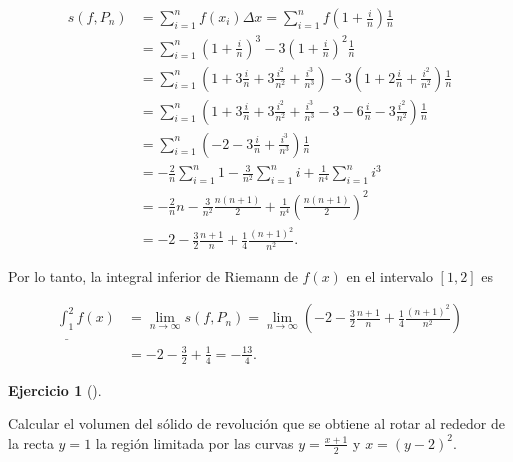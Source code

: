 \documentclass[
  spanish,
  a4paper,
]{scrreport}
\theoremstyle{definition}
\newtheorem{exercise}{Ejercicio}[chapter]
\theoremstyle{remark}
\begin{document}
\begin{tcolorbox}
\begin{align*}
s(f,P_n) 
&= \sum_{i=1}^{n} f(x_i) \Delta x = \sum_{i=1}^{n} f\left(1 + \frac{i}{n}\right) \frac{1}{n} \\
&= \sum_{i=1}^{n} \left(1 + \frac{i}{n}\right)^3 - 3\left(1 + \frac{i}{n}\right)^2 \frac{1}{n} \\
&= \sum_{i=1}^{n} \left(1 + 3\frac{i}{n} + 3\frac{i^2}{n^2} + \frac{i^3}{n^3}\right) - 3\left(1 + 2\frac{i}{n} + \frac{i^2}{n^2}\right) \frac{1}{n} \\
&= \sum_{i=1}^{n} \left(1 + 3\frac{i}{n} + 3\frac{i^2}{n^2} + \frac{i^3}{n^3} - 3 - 6\frac{i}{n} - 3\frac{i^2}{n^2}\right) \frac{1}{n}\\
&= \sum_{i=1}^{n} \left(-2 - 3\frac{i}{n} + \frac{i^3}{n^3}\right) \frac{1}{n}\\
&= -\frac{2}{n} \sum_{i=1}^{n} 1 - \frac{3}{n^2} \sum_{i=1}^{n} i + \frac{1}{n^4}\sum_{i=1}^{n} i^3 \\
&= -\frac{2}{n} n - \frac{3}{n^2} \frac{n(n+1)}{2} + \frac{1}{n^4} \left(\frac{n(n+1)}{2}\right)^2 \\
&= -2 - \frac{3}{2} \frac{n+1}{n} + \frac{1}{4} \frac{(n+1)^2}{n^2}.
\end{align*}

Por lo tanto, la integral inferior de Riemann de \(f(x)\) en el
intervalo \([1, 2]\) es

\begin{align*}
\underline{\int_1^2} f(x) 
&= \lim_{n \to \infty} s(f,P_n) 
= \lim_{n \to \infty} \left(-2 - \frac{3}{2} \frac{n+1}{n} + \frac{1}{4} \frac{(n+1)^2}{n^2}\right) \\
&= -2 - \frac{3}{2} + \frac{1}{4} = -\frac{13}{4}.
\end{align*}

\end{tcolorbox}

\begin{exercise}[]\protect\hypertarget{exr-2}{}\label{exr-2}

Calcular el volumen del sólido de revolución que se obtiene al rotar al
rededor de la recta \(y=1\) la región limitada por las curvas
\(y=\frac{x+1}{2}\) y \(x=(y-2)^2\).

\end{exercise}
\end{document}
